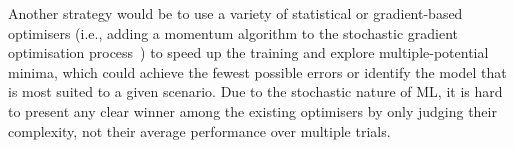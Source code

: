 Another strategy would be to use a variety of statistical or gradient-based optimisers (i.e., adding a momentum algorithm to the stochastic gradient optimisation process~\cite{xiao_accurate_2019}) to speed up the training and explore multiple-potential minima, which could achieve the fewest possible  errors or identify the model that is most suited to a given scenario.
Due to the stochastic nature of ML, it is hard to present any clear winner among the existing optimisers by only judging their complexity, not their average performance over multiple trials.
